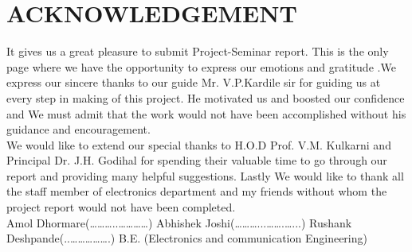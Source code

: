 \documentclass[12pt]{article}
\begin{document}
\section{ACKNOWLEDGEMENT}
  \justify
	It gives us a great pleasure to submit  Project-Seminar report. This is the only page where we have the opportunity to express our emotions and gratitude .We express our sincere thanks to our guide Mr. V.P.Kardile sir for guiding us at every step in making of this project. He motivated us and boosted our confidence and We must admit that the work would not have been accomplished without his guidance and encouragement. \\
	We would like to extend our special thanks to H.O.D Prof. V.M. Kulkarni and Principal Dr. J.H. Godihal for spending their valuable time to go through our report and providing many helpful suggestions. Lastly We would like to thank all the staff member of electronics department and my friends without whom the project report would not have been completed.\\
	 
   \hfill Amol Dhormare(………..…………)
   \hfill Abhishek Joshi(………...…….…...)
   \hfill Rushank Deshpande(..…………….) 
   \hfill B.E. (Electronics and communication Engineering)
\end{document}
